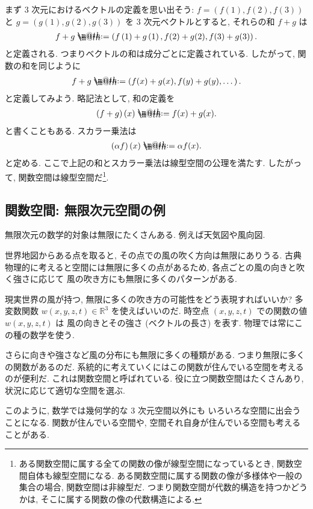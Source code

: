 \documentclass[openany, a4paper, oneside]{jsbook}
\makeatletter
\newcommand*{\defeq}{\mathrel{\rlap{%
\raisebox{0.3ex}{$\m@th\cdot$}}%
\raisebox{-0.3ex}{$\m@th\cdot$}}%
=}
\theoremstyle{break}
\theoremstyle{breakdefn}
\newcommand{\rbk}[1]{\left (#1\right)}
\newcommand{\bbR}{\mathbb{R}}
\makeatother
\begin{document}
まず 3 次元におけるベクトルの定義を思い出そう:
$f = (f(1), f(2), f(3))$ と $g = (g(1), g(2), g(3))$ を 3 次元ベクトルとすると,
それらの和 $f + g$ は
\begin{align}
 f + g
 \defeq
 \rbk{f\rbk{1} + g \rbk{1}, f(2) + g(2), f(3) + g(3)}.
\end{align}
と定義される.
つまりベクトルの和は成分ごとに定義されている.
したがって, 関数の和を同じように
\begin{align}
 f + g
 \defeq
 \rbk{f(x) + g(x), f(y) + g(y), \dots}.
\end{align}
と定義してみよう.
略記法として, 和の定義を
\begin{align}
 \rbk{f + g} (x)
 \defeq
 f(x) + g(x).
\end{align}
と書くこともある.
スカラー乗法は
\begin{align}
 \rbk{\alpha f} (x)
 \defeq
 \alpha f (x).
\end{align}
と定める.
ここで上記の和とスカラー乗法は線型空間の公理を満たす.
したがって, 関数空間は線型空間だ\footnote{ある関数空間に属する全ての関数の像が線型空間になっているとき, 関数空間自体も線型空間になる.
ある関数空間に属する関数の像が多様体や一般の集合の場合, 関数空間は非線型だ.
つまり関数空間が代数的構造を持つかどうかは, そこに属する関数の像の代数構造による.
 }.
\subsection{関数空間: 無限次元空間の例}


無限次元の数学的対象は無限にたくさんある.
例えば天気図や風向図.

世界地図からある点を取ると,
その点での風の吹く方向は無限にありうる.
古典物理的に考えると空間には無限に多くの点があるため,
各点ごとの風の向きと吹く強さに応じて
風の吹き方にも無限に多くのパターンがある.

現実世界の風が持つ, 無限に多くの吹き方の可能性をどう表現すればいいか?
多変数関数 $w(x,y,z,t) \in \bbR^3$ を使えばいいのだ.
時空点 $\rbk{x, y, z, t}$ での関数の値 $w(x,y,z,t)$ は
風の向きとその強さ (ベクトルの長さ) を表す.
物理では常にこの種の数学を使う.

さらに向きや強さなど風の分布にも無限に多くの種類がある.
つまり無限に多くの関数があるのだ.
系統的に考えていくにはこの関数が住んでいる空間を考えるのが便利だ.
これは関数空間と呼ばれている.
役に立つ関数空間はたくさんあり, 状況に応じて適切な空間を選ぶ.

このように, 数学では幾何学的な 3 次元空間以外にも
いろいろな空間に出会うことになる.
関数が住んでいる空間や, 空間それ自身が住んでいる空間も考えることがある.
\end{document}
